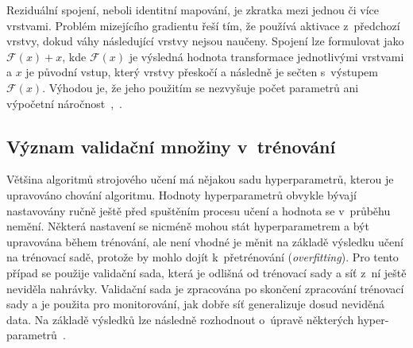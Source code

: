 Reziduální spojení, neboli identitní mapování, je zkratka mezi jednou či více vrstvami. Problém mizejícího gradientu řeší tím, že používá aktivace z~předchozí vrstvy, dokud váhy následující vrstvy nejsou naučeny. Spojení lze formulovat jako $\mathcal{F}(x) + x$, kde $\mathcal{F}(x)$ je výsledná hodnota transformace jednotlivými vrstvami a $x$ je původní vstup, který vrstvy přeskočí a následně je sečten s~výstupem $\mathcal{F}(x)$. Výhodou je, že jeho použitím se nezvyšuje počet parametrů ani výpočetní náročnost~\cite{he2015deep},~\cite{zaeemzadeh2018normpreservation}.


\subsection{Význam validační množiny v~trénování}
Většina algoritmů strojového učení má nějakou sadu hyperparametrů, kterou je upravováno chování algoritmu. Hodnoty hyperparametrů obvykle bývají nastavovány ručně ještě před spuštěním procesu učení a hodnota se v~průběhu nemění. Některá nastavení se nicméně mohou stát hyperparametrem a být upravována během trénování, ale není vhodné je měnit na základě výsledku učení na trénovací sadě, protože by mohlo dojít k~přetrénování (\textit{overfitting}). Pro tento případ se použije validační sada, která je odlišná od trénovací sady a síť z~ní ještě neviděla nahrávky. Validační sada je zpracována po skončení zpracování trénovací sady a je použita pro monitorování, jak dobře síť generalizuje dosud neviděná data. Na základě výsledků lze následně rozhodnout o~úpravě některých hyper-parametrů~\cite{mitdeeplearning}.





